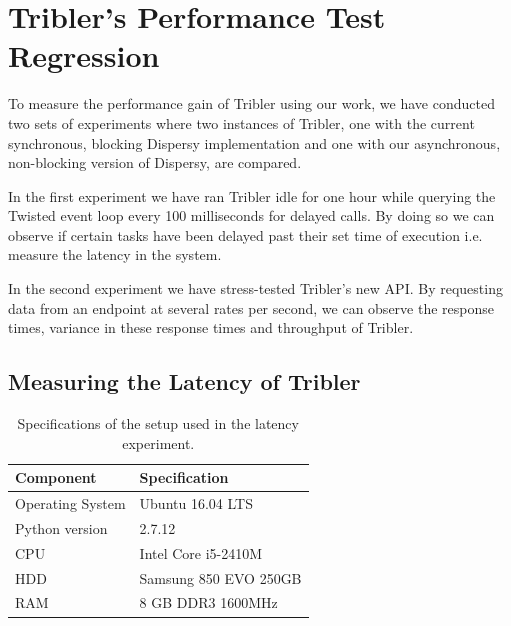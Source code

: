 \section{Tribler's Performance Test Regression}
\label{sct:tribler_performance_regression}

To measure the performance gain of Tribler using our work, we have conducted two sets of experiments where two instances of Tribler, one with the current synchronous, blocking Dispersy implementation and one with our asynchronous, non-blocking version of Dispersy, are compared.

In the first experiment we have ran Tribler idle for one hour while querying the Twisted event loop every 100 milliseconds for delayed calls.
By doing so we can observe if certain tasks have been delayed past their set time of execution i.e. measure the latency in the system.

In the second experiment we have stress-tested Tribler's new API.
By requesting data from an endpoint at several rates per second, we can observe the response times, variance in these response times and throughput of Tribler.

\subsection{Measuring the Latency of Tribler}

\begin{table}[h]
	\centering
	\caption{Specifications of the setup used in the latency experiment.}
	\label{table:specs_hp_elitebook}
	\begin{tabular}{l|l}
		\hline
		\textbf{Component}	& \textbf{Specification} \\ \hline
		Operating System   	& Ubuntu 16.04 LTS \\
		Python version		& 2.7.12 \\
		CPU					& Intel Core i5-2410M \\ 
		HDD					& Samsung 850 EVO 250GB  \\ 
		RAM					& 8 GB DDR3 1600MHz \\
	\end{tabular}
\end{table}

